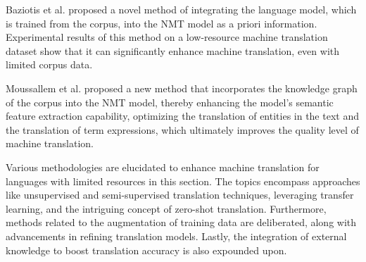 \documentclass[acmsmall]{acmart}
\begin{document}
Baziotis et al. \cite{n4-55} proposed a novel method of integrating the language model, which is trained from the corpus, into the NMT model as a priori information. Experimental results of this method on a low-resource machine translation dataset show that it can significantly enhance machine translation, even with limited corpus data. 

Moussallem et al. \cite{n4-56} proposed a new method that incorporates the knowledge graph of the corpus into the NMT model, thereby enhancing the model's semantic feature extraction capability, optimizing the translation of entities in the text and the translation of term expressions, which ultimately improves the quality level of machine translation.


Various methodologies are elucidated to enhance machine translation for languages with limited resources in this section. The topics encompass approaches like unsupervised and semi-supervised translation techniques, leveraging transfer learning, and the intriguing concept of zero-shot translation. Furthermore, methods related to the augmentation of training data are deliberated, along with advancements in refining translation models. Lastly, the integration of external knowledge to boost translation accuracy is also expounded upon.


\end{document}
